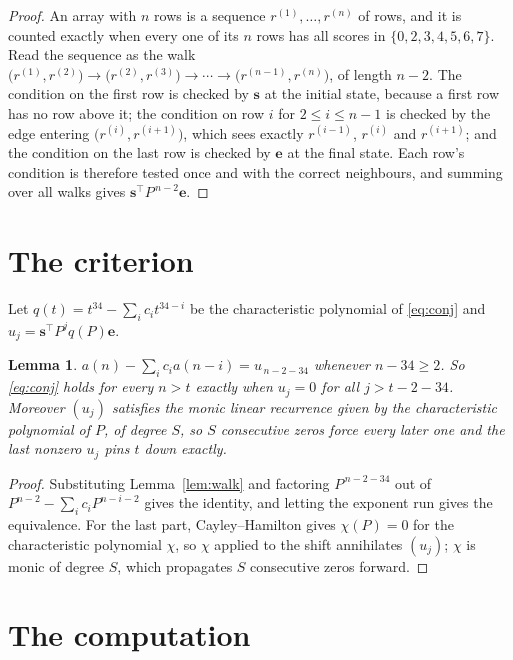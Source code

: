 \documentclass[11pt,a4paper]{article}
\theoremstyle{plain}
\newtheorem{lemma}[theorem]{Lemma}
\theoremstyle{definition}
\begin{document}
\begin{proof}
An array with $n$ rows is a sequence $r^{(1)},\dots,r^{(n)}$ of rows, and it is counted
exactly when every one of its $n$ rows has all scores in $\{0,2,3,4,5,6,7\}$. Read the sequence as the
walk $\bigl(r^{(1)},r^{(2)}\bigr)\to\bigl(r^{(2)},r^{(3)}\bigr)\to\cdots\to
\bigl(r^{(n-1)},r^{(n)}\bigr)$, of length $n-2$. The condition on the first row is
checked by $\mathbf{s}$ at the initial state, because a first row has no row above it; the
condition on row $i$ for $2\le i\le n-1$ is checked by the edge entering
$\bigl(r^{(i)},r^{(i+1)}\bigr)$, which sees exactly $r^{(i-1)}$, $r^{(i)}$ and
$r^{(i+1)}$; and the condition on the last row is checked by $\mathbf{e}$ at the final
state. Each row's condition is therefore tested once and with the correct neighbours, and
summing over all walks gives $\mathbf{s}^{\!\top}P^{\,n-2}\mathbf{e}$.
\end{proof}

\section{The criterion}

Let $q(t)=t^{34}-\sum_i c_i t^{34-i}$ be the characteristic polynomial of
\eqref{eq:conj} and $u_j=\mathbf{s}^{\!\top}P^{j}q(P)\mathbf{e}$.

\begin{lemma}\label{lem:crit}
$a(n)-\sum_i c_i a(n-i)=u_{\,n-2-34}$ whenever $n-34\ge2$. So \eqref{eq:conj}
holds for every $n>t$ exactly when $u_j=0$ for all $j>t-2-34$. Moreover $(u_j)$
satisfies the monic linear recurrence given by the characteristic polynomial of $P$, of
degree $S$, so $S$ consecutive zeros force every later one and the last nonzero $u_j$ pins
$t$ down exactly.
\end{lemma}

\begin{proof}
Substituting Lemma~\ref{lem:walk} and factoring $P^{\,n-2-34}$ out of
$P^{n-2}-\sum_i c_i P^{n-i-2}$ gives the identity, and letting the exponent run gives the
equivalence. For the last part, Cayley--Hamilton gives $\chi(P)=0$ for the characteristic
polynomial $\chi$, so $\chi$ applied to the shift annihilates $(u_j)$; $\chi$ is monic of
degree $S$, which propagates $S$ consecutive zeros forward.
\end{proof}

\section{The computation}
\end{document}
